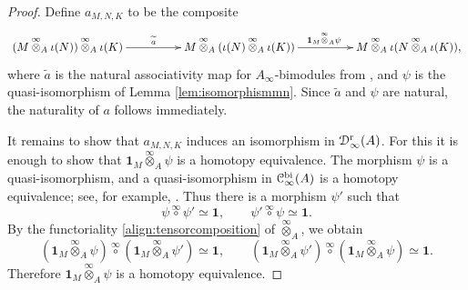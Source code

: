 \documentclass[a4paper, 11pt]{amsart}
\theoremstyle{definition}
\theoremstyle{remark}
\numberwithin{equation}{section}
\newcommand{\RR}{\mathrm{r}}
\newcommand{\BB}{\mathrm{bi}}
\newcommand{\id}{\mathbf{1}}
\newcommand{\EC}{\EuScript{C}}
\newcommand{\ED}{\EuScript{D}}
\begin{document}
\begin{proof}
Define $a_{M,N,K}$ to be the composite \[
 \xymatrix@C=4pc{
 (M\overset{\infty}{\otimes}_A \iota(N)) \overset{\infty}{\otimes}_A \iota(K) \ar[r]^-{\widetilde a} & M\overset{\infty}{\otimes}_A (\iota(N) \overset{\infty}{\otimes}_A \iota(K)) \ar[r]^{\id_M \overset{\infty}{\otimes}_A \psi} & M \overset{\infty}{\otimes}_A \iota(N\overset{\infty}{\otimes}_A \iota(K)),
 }
\] where $\widetilde a$ is the natural associativity map for $A_\infty$-bimodules from \cite[Corollary 1]{Fer12}, and $\psi$ is the quasi-isomorphism of Lemma \ref{lem:isomorphismmn}.
Since $\widetilde a$ and $\psi$ are natural, the naturality of $a$ follows immediately.

It remains to show that $a_{M,N,K}$ induces an isomorphism in $\ED^{\RR}_\infty(A)$. For this it is enough to show that $\id_M\overset{\infty}{\otimes}_A\psi$ is a homotopy equivalence. The morphism $\psi$ is a quasi-isomorphism, and a quasi-isomorphism in $\EC^{\BB}_\infty(A)$ is a homotopy equivalence; see, for example, \cite[Theorem 4.2.1]{Kel01}. Thus there is a morphism $\psi'$ such that
\[
\psi \overset{\infty}{\circ} \psi'\simeq \id,
\qquad
\psi' \overset{\infty}{\circ} \psi \simeq \id.
\]
By the functoriality \eqref{align:tensorcomposition} of $\overset{\infty}{\otimes}_A$, we obtain
\[
(\id_M \overset{\infty}{\otimes}_A \psi ) \overset{\infty}{\circ} (\id_M \overset{\infty}{\otimes}_A \psi') \simeq \id,
\qquad
(\id_M \overset{\infty}{\otimes}_A \psi') \overset{\infty}{\circ} (\id_M \overset{\infty}{\otimes}_A \psi ) \simeq \id.
\]
Therefore $\id_M\overset{\infty}{\otimes}_A\psi$ is a homotopy equivalence.


\end{proof}
\end{document}
